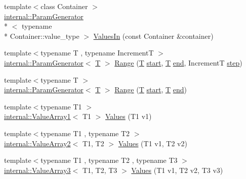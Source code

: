 \begin{DoxyCompactItemize}
\item 
{\footnotesize template$<$class Container $>$ }\\\hyperlink{classtesting_1_1internal_1_1ParamGenerator}{internal\-::\-Param\-Generator}\\*
$<$ typename \\*
Container\-::value\-\_\-type $>$ \hyperlink{namespacetesting_aa67d0c8470c5f69fcfcacc9e775fa982}{Values\-In} (const Container \&container)
\item 
{\footnotesize template$<$typename T , typename Increment\-T $>$ }\\\hyperlink{classtesting_1_1internal_1_1ParamGenerator}{internal\-::\-Param\-Generator}$<$ \hyperlink{calib3d_8hpp_a3efb9551a871ddd0463079a808916717}{T} $>$ \hyperlink{namespacetesting_a265ed70a86cf2d6641582c45ad9529e2}{Range} (\hyperlink{calib3d_8hpp_a3efb9551a871ddd0463079a808916717}{T} \hyperlink{legacy_8hpp_a7e7356db167a8b78d03c01efc265b638}{start}, \hyperlink{calib3d_8hpp_a3efb9551a871ddd0463079a808916717}{T} \hyperlink{legacy_8hpp_ab21668ff869102944cbf3bb534bba27d}{end}, Increment\-T \hyperlink{legacy_8hpp_abc16e65f240ed0c8f3e876e8732c0a33}{step})
\item 
{\footnotesize template$<$typename T $>$ }\\\hyperlink{classtesting_1_1internal_1_1ParamGenerator}{internal\-::\-Param\-Generator}$<$ \hyperlink{calib3d_8hpp_a3efb9551a871ddd0463079a808916717}{T} $>$ \hyperlink{namespacetesting_a56a45f85a1238dfc92e6fca03eb3a2e4}{Range} (\hyperlink{calib3d_8hpp_a3efb9551a871ddd0463079a808916717}{T} \hyperlink{legacy_8hpp_a7e7356db167a8b78d03c01efc265b638}{start}, \hyperlink{calib3d_8hpp_a3efb9551a871ddd0463079a808916717}{T} \hyperlink{legacy_8hpp_ab21668ff869102944cbf3bb534bba27d}{end})
\item 
{\footnotesize template$<$typename T1 $>$ }\\\hyperlink{classtesting_1_1internal_1_1ValueArray1}{internal\-::\-Value\-Array1}$<$ T1 $>$ \hyperlink{namespacetesting_a8209ef59db08b8ad4beed30d8d6e6a88}{Values} (T1 v1)
\item 
{\footnotesize template$<$typename T1 , typename T2 $>$ }\\\hyperlink{classtesting_1_1internal_1_1ValueArray2}{internal\-::\-Value\-Array2}$<$ T1, T2 $>$ \hyperlink{namespacetesting_a7cfec131dd8773430fb87483509cc6d0}{Values} (T1 v1, T2 v2)
\item 
{\footnotesize template$<$typename T1 , typename T2 , typename T3 $>$ }\\\hyperlink{classtesting_1_1internal_1_1ValueArray3}{internal\-::\-Value\-Array3}$<$ T1, T2, T3 $>$ \hyperlink{namespacetesting_a344ca3522cb99a7b98801a9577993011}{Values} (T1 v1, T2 v2, T3 v3)

\end{DoxyCompactItemize}
